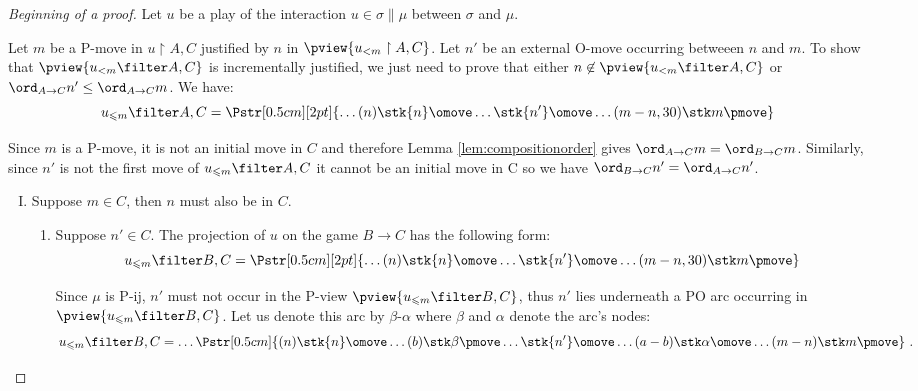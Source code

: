 \begin{proof}[Beginning of a proof]
Let $u$ be a play of the interaction $u \in \sigma \| \mu$ between $\sigma$ and $\mu$.

%
%
%
%

Let $m$ be a P-move in $u \upharpoonright A,C$
justified by $n$ in $\pview{u_{<m} \upharpoonright A , C}$.
Let $n'$ be an external O-move occurring betweeen $n$ and $m$.
To show that $\pview{u_{<m} \filter A,C}$ is incrementally justified, we just need to prove that either $n\not\in \pview{u_{<m} \filter A,C}$ or $\ord_{A\rightarrow C} n' \leq \ord _{A\rightarrow C} m$. We have:
$$ u_{\prefixof m} \filter A,C =  
\Pstr[0.5cm][2pt]{ \ldots (n){\stk {n} \omove}  \ldots
 {\stk {n'} \omove}  \ldots  (m-n,30){\stk m \pmove}
}
$$

Since $m$ is a P-move, it is not an initial move in $C$  and therefore Lemma \ref{lem:compositionorder} gives $\ord_{A\rightarrow C}{m} = \ord_{B \rightarrow C}{m}$.
Similarly, since $n'$ is not the first
move of $ u_{\prefixof m} \filter A,C$  it cannot be an initial move in C
so we have $\ord_{B\rightarrow C}{n'} = \ord_{A\rightarrow C} {n'}$.

\begin{enumerate}[I.]
\item \label{case:mC}
Suppose $m \in C$, then $n$ must also be in $C$.

\begin{enumerate}
\item \label{case:mCnpC} Suppose $n'\in C$. The projection of $u$ on the game $B\rightarrow C$ has the following form:
$$ u_{\prefixof m} \filter B,C =  
\Pstr[0.5cm][2pt]{ \ldots (n){\stk {n} \omove}  \ldots
 {\stk {n'} \omove}  \ldots  (m-n,30){\stk m \pmove}
}$$

Since $\mu$ is P-ij, $n'$ must not occur in the P-view $\pview{u_{\prefixof m} \filter B,C}$, thus $n'$ lies underneath a PO arc occurring in $\pview{u_{\prefixof m} \filter B,C}$. Let us denote this arc by $\beta$-$\alpha$ where $\beta$ and $\alpha$ denote the arc's nodes:
$$ u_{\prefixof m} \filter B,C = \ldots  
\Pstr[0.5cm]{
 (n){\stk{n} \omove } \ldots (b){\stk\beta \pmove} \ldots \stk{n'} \omove  
\ldots (a-b){\stk\alpha \omove}  \ldots (m-n){\stk m  \pmove }
} \ .
$$
  

\end{enumerate}
\end{enumerate}
\end{proof}
